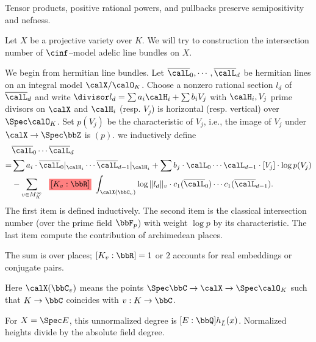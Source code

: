 Tensor products, positive rational powers, and pullbacks preserve semipositivity and nefness.

\begin{construction}[label=\labelNFM{constr:intersection-number-of-adelic-line-bundles}, status=draft, tag=0000000]
	Let $X$ be a projective variety over $K$.
	We will try to construction the intersection number of $\cinf$--model adelic line bundles on $X$.

	We begin from hermitian line bundles.
	Let $\overline{\calL}_0,\cdots,\overline{\calL}_d$ be hermitian lines on an integral model $\calX/\calO_K$.
	Choose a nonzero rational section $l_d$ of $\overline{\calL}_d$ and write $\divisor l_d = \sum a_i \calH_i + \sum b_i V_j$ with $\calH_i,V_j$ prime divisors on $\calX$ and $\calH_i$ (resp. $V_j$) is horizontal (resp. vertical) over $\Spec \calO_K$.
	Set $p(V_j)$ be the characteristic of $V_j$, i.e., the image of $V_j$ under $\calX \to \Spec \bbZ$ is $(p)$.
	we inductively define
	\begin{align*}
		  & \overline{\calL}_0 \cdots \overline{\calL}_d                                                                                                                    \\
		= & \sum a_i \cdot \overline{\calL}_0|_{\calH_i} \cdots \overline{\calL}_{d-1}|_{\calH_i} + \sum b_j \cdot \calL_0 \cdots \calL_{d-1} \cdot [V_j] \cdot \log p(V_j) \\
		  & - \sum_{v \in M_K^\infty} \latexaddedmath{[K_v:\bbR]}\int_{\calX(\bbC_v)} \log \|l_d\|_v \cdot c_1(\overline{\calL}_0)\cdots c_1(\overline{\calL}_{d-1}).
	\end{align*}
	The first item is defined inductively.
	The second item is the classical intersection number (over the prime field $\bbF_p$) with weight $\log p$ by its characteristic.
	The last item compute the contribution of archimedean places.
	\begin{latexmathchange}
		The sum is over places; $[K_v:\bbR] = 1$ or $2$ accounts for real embeddings or conjugate pairs.
	\end{latexmathchange}
	Here $\calX(\bbC_v)$ means the points $\Spec \bbC \to \calX \to \Spec \calO_K$ such that $K \to \bbC$ coincides with $v:K \to \bbC$.
	\begin{latexmathchange}
		For $X = \Spec E$, this unnormalized degree is $[E:\bbQ]h_{\bar L}(x)$. Normalized heights divide by the absolute field degree.
	\end{latexmathchange}
	\Yang{}


\end{construction}

